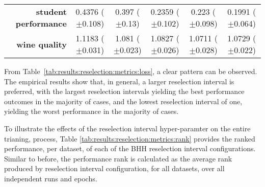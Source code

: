 \begin{table}[htb]
{\begin{tabular}{r|ccccc}
			\textbf{student performance} & \cellcolor[rgb]{ .973,  .412,  .42}0.4376 ($\pm$0.108)       & \cellcolor[rgb]{ .98,  .518,  .443}0.397 ($\pm$0.13)    & \cellcolor[rgb]{ 1,  .922,  .518}0.2359 ($\pm$0.102)    & \cellcolor[rgb]{ .784,  .859,  .502}0.223 ($\pm$0.098)  & \cellcolor[rgb]{ .388,  .745,  .482}0.1991 ($\pm$0.064) \\
			\textbf{wine quality}        & \cellcolor[rgb]{ .973,  .412,  .42}1.1183 ($\pm$0.031)       & \cellcolor[rgb]{ 1,  .922,  .518}1.081 ($\pm$0.023)     & \cellcolor[rgb]{ 1,  .898,  .514}1.0827 ($\pm$0.026)    & \cellcolor[rgb]{ .388,  .745,  .482}1.0711 ($\pm$0.028) & \cellcolor[rgb]{ .498,  .776,  .486}1.0729 ($\pm$0.022) \\
		\end{tabular}%
	}
\end{table}%

From Table~\ref{tab:results:reselection:metrics:loss}, a clear pattern can be observed. The empirical results show that, in general, a larger reselection interval is preferred, with the largest reselection intervals yielding the best performance outcomes in the majority of cases, and the lowest reselection interval of one, yielding the worst performance in the majority of cases.

To illustrate the effects of the reselection interval hyper-paramter on the entire trianing, process, Table \ref{tab:results:reselection:metrics:rank} provides the ranked performance, per dataset, of each of the \acs{BHH} reselection interval configurations. Similar to before, the performance rank is calculated as the average rank produced by reselection interval configuration, for all datasets, over all independent runs and epochs.

